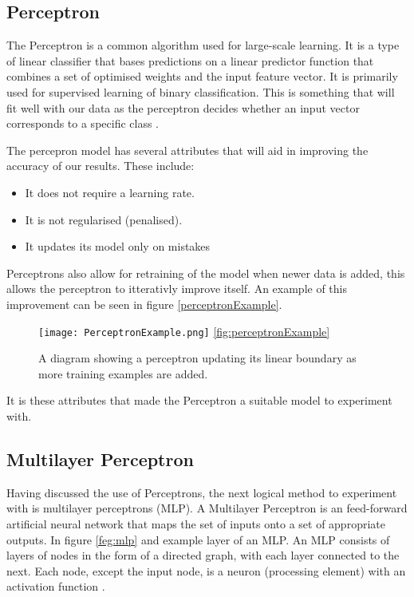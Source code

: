 \documentclass[bsc,frontabs,twoside,singlespacing,parskip,deptreport]{infthesis}     %
\begin{document}
\subsection{Perceptron}
The Perceptron is a common algorithm used for large-scale learning.
It is a type of linear classifier that bases predictions on a linear predictor function that combines a set of optimised weights
and the input feature vector.
It is primarily used for supervised learning of binary classification.
This is something that will fit well with our data as the perceptron decides whether an input vector
corresponds to a specific class \cite{freund1999large}.

The percepron model has several attributes that will aid in improving the accuracy of our results.
These include:
\begin{itemize}
\item It does not require a learning rate.
\item It is not regularised (penalised).
\item It updates its model only on mistakes
\end{itemize}

Perceptrons also allow for retraining of the model when newer data is added, this allows the perceptron to
itterativly improve itself. An example of this improvement can be seen in figure \ref{perceptronExample}.
\begin{figure}[ht]
  \centering
  \texttt{[image: PerceptronExample.png]}
  \ref{fig:perceptronExample}
  \caption{A diagram showing a perceptron updating its linear boundary as more training examples are added. }
\end{figure}


It is these attributes that made the Perceptron a suitable model to experiment with.
\subsection{Multilayer Perceptron}
Having discussed the use of Perceptrons, the next logical method to experiment with is multilayer perceptrons (MLP).
A Multilayer Perceptron is an feed-forward artificial neural network that maps the set of inputs
onto a set of appropriate outputs.
In figure \ref{feg:mlp} and example layer of an MLP.
An MLP consists of layers of  nodes in the form of a directed graph, with each layer connected to the next.
Each node, except the input node, is a neuron (processing element) with an activation function \cite{}.%
\end{document}
